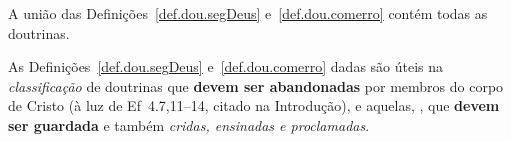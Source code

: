     \begin{COR}
        \label{cor.dicotomia.2}
        A união das Definições~\ref{def.dou.segDeus} e~\ref{def.dou.comerro} contém todas as doutrinas.
    \end{COR}

    As Definições~\ref{def.dou.segDeus} e~\ref{def.dou.comerro}  dadas  são  úteis  na  \emph{classificação}  de  doutrinas  que
    \textbf{devem ser abandonadas} por membros do corpo de Cristo (à luz de Ef~4.7,11--14, citado  na  Introdução),  e  aquelas,
    , que \textbf{devem ser guardada} e também \emph{cridas, ensinadas e proclamadas}.


